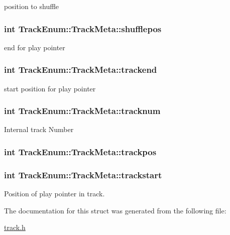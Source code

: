 position to shuffle 

\hypertarget{structTrackEnum_1_1TrackMeta_a1997282ab24eb2e282c3752cb1e6d265}{
\subsubsection[{shufflepos}]{\setlength{\rightskip}{0pt plus 5cm}int Track\-Enum\-::\-Track\-Meta\-::shufflepos}}\label{structTrackEnum_1_1TrackMeta_a1997282ab24eb2e282c3752cb1e6d265}


end for play pointer 

\hypertarget{structTrackEnum_1_1TrackMeta_a30ae4258c286830c56687282f5f340e0}{
\subsubsection[{trackend}]{\setlength{\rightskip}{0pt plus 5cm}int Track\-Enum\-::\-Track\-Meta\-::trackend}}\label{structTrackEnum_1_1TrackMeta_a30ae4258c286830c56687282f5f340e0}


start position for play pointer 

\hypertarget{structTrackEnum_1_1TrackMeta_ad46ff097f05c6c099c60f2274ecb8809}{
\subsubsection[{tracknum}]{\setlength{\rightskip}{0pt plus 5cm}int Track\-Enum\-::\-Track\-Meta\-::tracknum}}\label{structTrackEnum_1_1TrackMeta_ad46ff097f05c6c099c60f2274ecb8809}
Internal track Number \hypertarget{structTrackEnum_1_1TrackMeta_a5f6e9b4f14d0909232d66fa239d4c599}{
\subsubsection[{trackpos}]{\setlength{\rightskip}{0pt plus 5cm}int Track\-Enum\-::\-Track\-Meta\-::trackpos}}\label{structTrackEnum_1_1TrackMeta_a5f6e9b4f14d0909232d66fa239d4c599}
\hypertarget{structTrackEnum_1_1TrackMeta_ab3e1eb6af3878c93058f8e1f605a04ca}{
\subsubsection[{trackstart}]{\setlength{\rightskip}{0pt plus 5cm}int Track\-Enum\-::\-Track\-Meta\-::trackstart}}\label{structTrackEnum_1_1TrackMeta_ab3e1eb6af3878c93058f8e1f605a04ca}


Position of play pointer in track. 



The documentation for this struct was generated from the following file\-:\begin{DoxyCompactItemize}
\item 
\hyperlink{track_8h}{track.\-h}\end{DoxyCompactItemize}
